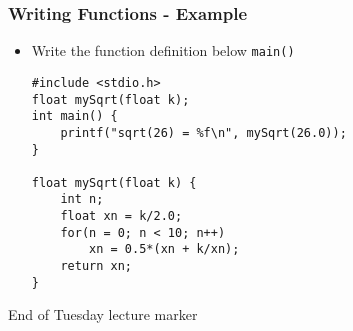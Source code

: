 \documentclass[14pt]{beamer}
\begin{document}
\begin{frame}[fragile]
\frametitle{Writing Functions - Example}
\begin{itemize}
\item Write the function definition below \texttt{main()}
\begin{lstlisting}[style=CStyle]
#include <stdio.h>
float mySqrt(float k);
int main() {
	printf("sqrt(26) = %f\n", mySqrt(26.0));
}

float mySqrt(float k) {
	int n;
	float xn = k/2.0;
	for(n = 0; n < 10; n++)
		xn = 0.5*(xn + k/xn);
	return xn;
}
\end{lstlisting}
\end{itemize}
\end{frame}

\begin{frame}
End of Tuesday lecture marker
\end{frame}
\end{document}
